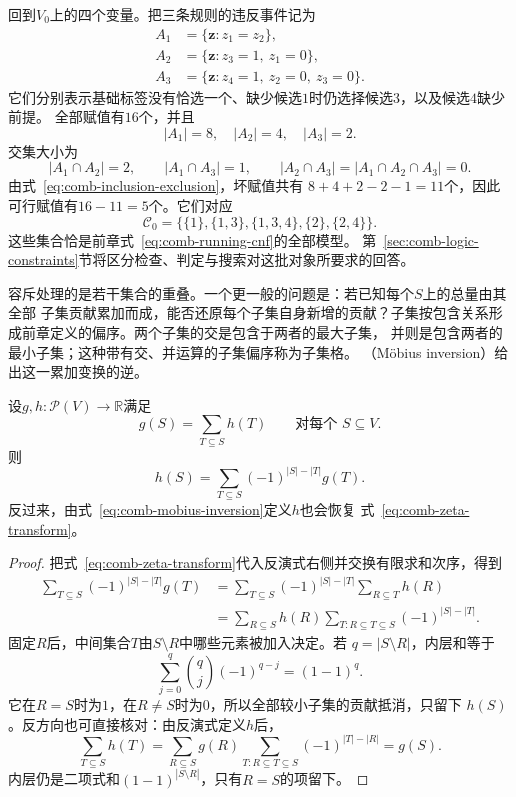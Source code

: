 回到$V_0$上的四个变量。把三条规则的违反事件记为
\[
  \begin{aligned}
    A_1&=\{\bm{z}:z_1=z_2\},\\
    A_2&=\{\bm{z}:z_3=1,\ z_1=0\},\\
    A_3&=\{\bm{z}:z_4=1,\ z_2=0,\ z_3=0\}.
  \end{aligned}
\]
它们分别表示基础标签没有恰选一个、缺少候选$1$时仍选择候选$3$，以及候选$4$缺少前提。
全部赋值有$16$个，并且
\[
  |A_1|=8,\quad |A_2|=4,\quad |A_3|=2.
\]
交集大小为
\[
  |A_1\cap A_2|=2,\qquad
  |A_1\cap A_3|=1,\qquad
  |A_2\cap A_3|=|A_1\cap A_2\cap A_3|=0.
\]
由式~\eqref{eq:comb-inclusion-exclusion}，坏赋值共有
$8+4+2-2-1=11$个，因此可行赋值有$16-11=5$个。它们对应
\begin{equation}
  \mathcal{C}_0
  =
  \bigl\{
  \{1\},\{1,3\},\{1,3,4\},\{2\},\{2,4\}
  \bigr\}.
  \label{eq:comb-running-feasible-family}
\end{equation}
这些集合恰是前章式~\eqref{eq:comb-running-cnf}的全部模型。
第~\ref{sec:comb-logic-constraints}节将区分检查、判定与搜索对这批对象所要求的回答。

容斥处理的是若干集合的重叠。一个更一般的问题是：若已知每个$S$上的总量由其全部
子集贡献累加而成，能否还原每个子集自身新增的贡献？子集按包含关系形成前章定义的偏序。两个子集的交是包含于两者的最大子集，
并则是包含两者的最小子集；这种带有交、并运算的子集偏序称为子集格。
（Möbius inversion）给出这一累加变换的逆。

\begin{theorem}
\label{thm:comb-mobius-inversion}
设$g,h:\mathcal{P}(V)\to\mathbb{R}$满足
\begin{equation}
  g(S)=\sum_{T\subseteq S}h(T)
  \qquad\text{对每个 }S\subseteq V.
  \label{eq:comb-zeta-transform}
\end{equation}
则
\begin{equation}
  h(S)
  =
  \sum_{T\subseteq S}(-1)^{|S|-|T|}g(T).
  \label{eq:comb-mobius-inversion}
\end{equation}
反过来，由式~\eqref{eq:comb-mobius-inversion}定义$h$也会恢复
式~\eqref{eq:comb-zeta-transform}。
\end{theorem}

\begin{proof}
把式~\eqref{eq:comb-zeta-transform}代入反演式右侧并交换有限求和次序，得到
\begin{align*}
  \sum_{T\subseteq S}(-1)^{|S|-|T|}g(T)
  &=
  \sum_{T\subseteq S}(-1)^{|S|-|T|}
  \sum_{R\subseteq T}h(R)\\
  &=
  \sum_{R\subseteq S}h(R)
  \sum_{T:R\subseteq T\subseteq S}
  (-1)^{|S|-|T|}.
\end{align*}
固定$R$后，中间集合$T$由$S\setminus R$中哪些元素被加入决定。若
$q=|S\setminus R|$，内层和等于
\[
  \sum_{j=0}^{q}\binom{q}{j}(-1)^{q-j}
  =(1-1)^q.
\]
它在$R=S$时为$1$，在$R\neq S$时为$0$，所以全部较小子集的贡献抵消，只留下
$h(S)$。反方向也可直接核对：由反演式定义$h$后，
\[
 \sum_{T\subseteq S}h(T)
 =\sum_{R\subseteq S}g(R)
   \sum_{T:R\subseteq T\subseteq S}(-1)^{|T|-|R|}
 =g(S).
\]
内层仍是二项式和$(1-1)^{|S\setminus R|}$，只有$R=S$的项留下。
\end{proof}

